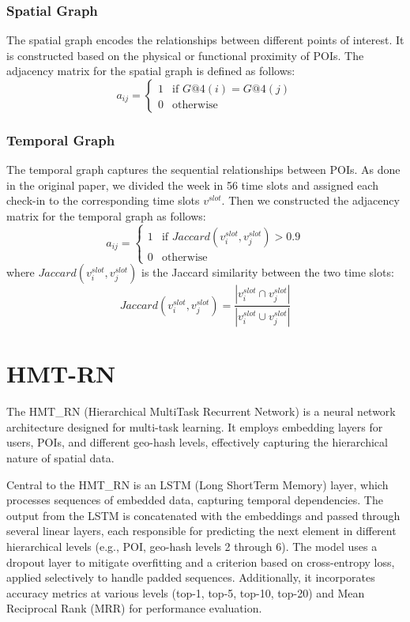 \documentclass[twocolumn]{article}
\begin{document}
\subsubsection{Spatial Graph}
The spatial graph encodes the relationships between 
different points of interest. It is constructed based on the
 physical or functional proximity of POIs. The adjacency matrix 
 for the spatial graph is defined as follows:
  \begin{equation}
      a_{ij} = \begin{cases}
      1 & \text{if } G@4(i) = G@4(j) \\
      0 & \text{otherwise}
      \end{cases}
  \end{equation}
\subsubsection{Temporal Graph}
The temporal graph captures the sequential relationships between
  POIs. As done in the original paper,
  we divided the week in 56 time slots and assigned each check-in to
   the corresponding time slots $v^{slot}$. Then we constructed the adjacency matrix
    for the temporal graph as follows:
  \begin{equation}
      a_{ij} = \begin{cases}
      1 & \text{if } Jaccard(v^{slot}_i, v^{slot}_j) > 0.9 \\
      0 & \text{otherwise}
      \end{cases}
  \end{equation}
  where $Jaccard(v^{slot}_i, v^{slot}_j)$ is the Jaccard 
  similarity between the two time slots:
  \begin{equation}
      Jaccard(v^{slot}_i, v^{slot}_j) = \frac{|v^{slot}_i \cap v^{slot}_j|}{|v^{slot}_i \cup v^{slot}_j|}
  \end{equation}



\section{HMT-RN}
The HMT\_RN (Hierarchical Multi\-Task Recurrent Network) is a
neural network architecture designed for multi-task learning. It employs 
embedding layers for users, POIs, and different geo-hash levels,
 effectively capturing the hierarchical nature of spatial data.

Central to the HMT\_RN is an LSTM (Long Short\-Term Memory) layer,
which processes sequences of embedded data, capturing temporal dependencies.
The output from the LSTM is concatenated with the embeddings
and passed through several linear layers, each responsible
for predicting the next element in different hierarchical 
levels (e.g., POI, geo-hash levels 2 through 6). The model 
uses a dropout layer to mitigate overfitting and a
criterion based on cross-entropy loss, applied selectively
to handle padded sequences. Additionally, 
it incorporates accuracy metrics at various 
levels (top-1, top-5, top-10, top-20) and 
Mean Reciprocal Rank (MRR) for performance
evaluation.
\end{document}
